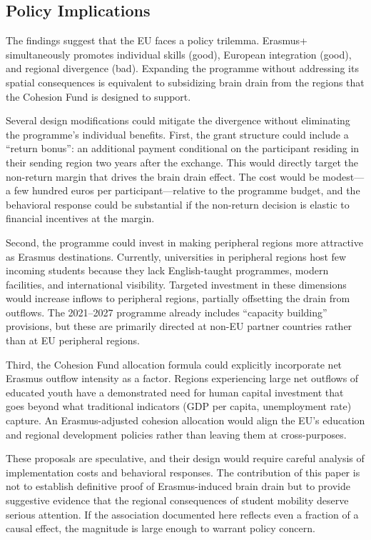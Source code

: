 \documentclass[12pt]{article}
\begin{document}
\subsection{Policy Implications}

The findings suggest that the EU faces a policy trilemma. Erasmus+ simultaneously promotes individual skills (good), European integration (good), and regional divergence (bad). Expanding the programme without addressing its spatial consequences is equivalent to subsidizing brain drain from the regions that the Cohesion Fund is designed to support.

Several design modifications could mitigate the divergence without eliminating the programme's individual benefits. First, the grant structure could include a ``return bonus'': an additional payment conditional on the participant residing in their sending region two years after the exchange. This would directly target the non-return margin that drives the brain drain effect. The cost would be modest---a few hundred euros per participant---relative to the programme budget, and the behavioral response could be substantial if the non-return decision is elastic to financial incentives at the margin.

Second, the programme could invest in making peripheral regions more attractive as Erasmus destinations. Currently, universities in peripheral regions host few incoming students because they lack English-taught programmes, modern facilities, and international visibility. Targeted investment in these dimensions would increase inflows to peripheral regions, partially offsetting the drain from outflows. The 2021--2027 programme already includes ``capacity building'' provisions, but these are primarily directed at non-EU partner countries rather than at EU peripheral regions.

Third, the Cohesion Fund allocation formula could explicitly incorporate net Erasmus outflow intensity as a factor. Regions experiencing large net outflows of educated youth have a demonstrated need for human capital investment that goes beyond what traditional indicators (GDP per capita, unemployment rate) capture. An Erasmus-adjusted cohesion allocation would align the EU's education and regional development policies rather than leaving them at cross-purposes.

These proposals are speculative, and their design would require careful analysis of implementation costs and behavioral responses. The contribution of this paper is not to establish definitive proof of Erasmus-induced brain drain but to provide suggestive evidence that the regional consequences of student mobility deserve serious attention. If the association documented here reflects even a fraction of a causal effect, the magnitude is large enough to warrant policy concern.
\end{document}
